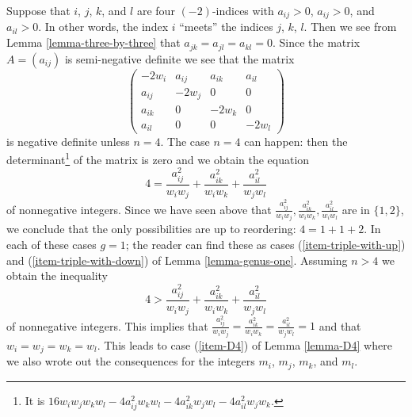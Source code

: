 \documentclass{stacks-project}
\theoremstyle{plain}
\theoremstyle{definition}
\theoremstyle{remark}
\numberwithin{equation}{subsection}
\begin{document}
\noindent
Suppose that $i$, $j$, $k$,
and $l$ are four $(-2)$-indices with $a_{ij} > 0$, $a_{ij} > 0$, and
$a_{il} > 0$. In other words, the index $i$ ``meets'' the indices
$j$, $k$, $l$. Then we see from Lemma \ref{lemma-three-by-three} that
$a_{jk} = a_{jl} = a_{kl} = 0$. Since the matrix $A = (a_{ij})$ is
semi-negative definite we see that the matrix
$$
\left(
\begin{matrix}
-2w_i & a_{ij} & a_{ik} & a_{il} \\
a_{ij} & -2w_j & 0 & 0 \\
a_{ik} & 0 & -2w_k & 0 \\
a_{il} & 0 & 0 & -2w_l
\end{matrix}
\right)
$$
is negative definite unless $n = 4$. The case $n = 4$ can happen:
then the determinant\footnote{It is
$16w_iw_jw_kw_l - 4a_{ij}^2w_kw_l - 4a_{ik}^2w_jw_l - 4a_{il}^2w_jw_k$.}
of the matrix is zero and we obtain the equation
$$
4 = \frac{a_{ij}^2}{w_iw_j} + \frac{a_{ik}^2}{w_iw_k} + \frac{a_{il}^2}{w_jw_l}
$$
of nonnegative integers. Since we have seen above that
$\frac{a_{ij}^2}{w_iw_j}, \frac{a_{ik}^2}{w_iw_k}, \frac{a_{il}^2}{w_iw_l}$
are in $\{1, 2\}$, we conclude that the only possibilities
are up to reordering: $4 = 1 + 1 + 2$. In each of these
cases $g = 1$; the reader can find these as cases
(\ref{item-triple-with-up}) and (\ref{item-triple-with-down}) of
Lemma \ref{lemma-genus-one}. Assuming $n > 4$
we obtain the inequality
$$
4 > \frac{a_{ij}^2}{w_iw_j} + \frac{a_{ik}^2}{w_iw_k} + \frac{a_{il}^2}{w_jw_l}
$$
of nonnegative integers. This implies that $\frac{a_{ij}^2}{w_iw_j} =
\frac{a_{ik}^2}{w_iw_k} = \frac{a_{il}^2}{w_jw_l} = 1$
and that $w_i = w_j = w_k = w_l$. This leads to case
(\ref{item-D4}) of Lemma \ref{lemma-D4}
where we also wrote out the consequences for the integers $m_i$, $m_j$, $m_k$,
and $m_l$.
\end{document}
